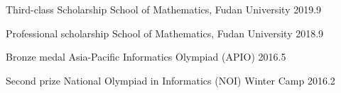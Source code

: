 



\begin{cvhonors}

  \cvhonor
    {Third-class Scholarship} %
    {School of Mathematics, Fudan University} %
    {} %
    {2019.9} %

  \cvhonor
    {Professional scholarship} %
    {School of Mathematics, Fudan University} %
    {} %
    {2018.9} %

  \cvhonor
    {Bronze medal} %
    {Asia-Pacific Informatics Olympiad (APIO)} %
    {} %
    {2016.5} %

  \cvhonor
    {Second prize} %
    {National Olympiad in Informatics (NOI) Winter Camp} %
    {} %
    {2016.2} %

\end{cvhonors}

